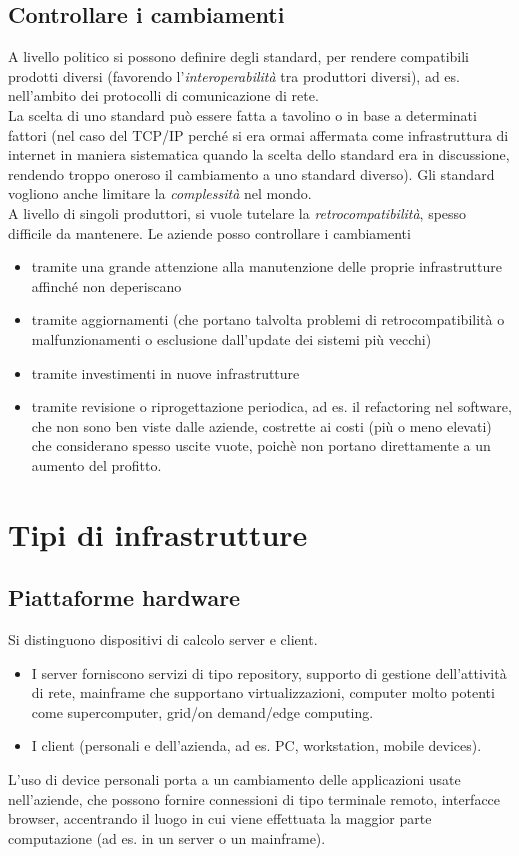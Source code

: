 \subsection{Controllare i cambiamenti}
A livello politico si possono definire degli standard, per rendere compatibili prodotti diversi (favorendo l'\textit{interoperabilit\`a} tra produttori diversi), ad es. nell'ambito dei protocolli di comunicazione di rete.\\
 La scelta di uno standard pu\`o essere fatta a tavolino o in base a determinati fattori (nel caso del TCP/IP perch\'e si era ormai affermata come infrastruttura di internet in maniera sistematica quando la scelta dello standard era in discussione, rendendo troppo oneroso il cambiamento a uno standard diverso).
Gli standard vogliono anche limitare la \textit{complessit\`a} nel mondo. \\
A livello di singoli produttori, si vuole tutelare la \textit{retrocompatibilit\`a}, spesso difficile da mantenere.
Le aziende posso controllare i cambiamenti
\begin{itemize}
\item tramite una grande attenzione alla manutenzione delle proprie infrastrutture affinch\'e non deperiscano
\item tramite aggiornamenti (che portano talvolta problemi di retrocompatibilit\`a o malfunzionamenti o esclusione dall'update dei sistemi pi\`u vecchi)
\item tramite investimenti in nuove infrastrutture
\item tramite revisione o riprogettazione periodica, ad es. il refactoring nel software, che non sono ben viste dalle aziende, costrette ai costi (pi\`u o meno elevati) che considerano spesso uscite vuote, poich\`e non portano direttamente a un aumento del profitto.
\end{itemize}

\section{Tipi di infrastrutture}
\subsection{Piattaforme hardware}
Si distinguono dispositivi di calcolo server e client.\\
\begin{itemize}
  \item I server forniscono servizi di tipo repository, supporto di gestione dell'attivit\`a di rete, mainframe che supportano virtualizzazioni, computer molto potenti come supercomputer, grid/on demand/edge computing.
  \item
  I client (personali e dell'azienda, ad es. PC, workstation, mobile devices).
\end{itemize}
L'uso di device personali porta a un cambiamento delle applicazioni usate nell'aziende, che possono fornire connessioni di tipo terminale remoto, interfacce browser, accentrando il luogo in cui viene effettuata la maggior parte computazione (ad es. in un server o un mainframe).
